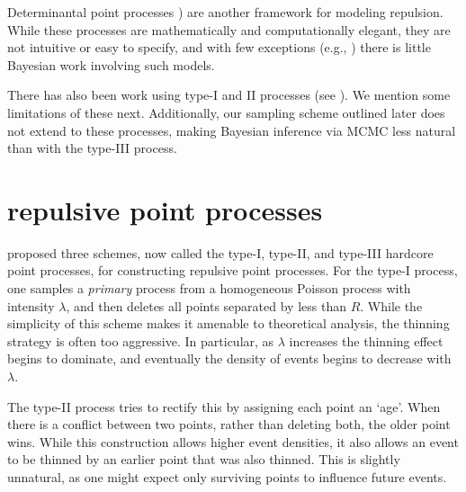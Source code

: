 \documentclass{statsoc}
\begin{document}
Determinantal point processes \citep{hough_dpp,Scardicchio09}) are another framework for modeling repulsion. While
these processes are mathematically and computationally elegant, they are not intuitive or easy to specify, and with few exceptions (e.g., \citet{affandi2014learning}) there is little Bayesian work involving such models. %


There has also been work using \matern type-I and II processes (see \cite{WallSar11}). We mention some limitations of these next. Additionally,
our sampling scheme outlined later does not extend to these processes, making Bayesian inference via MCMC less natural than with the
type-III process.

\section{\matern repulsive point processes}

\cite{Matern60} proposed three schemes, now called the \matern type-I, type-II, and type-III hardcore point processes,
for constructing repulsive point processes.
For the type-I process, one samples a \emph{primary} process from a homogeneous Poisson process 
with intensity $\lambda$, and then deletes all points separated by less than $R$. While the simplicity of this scheme makes it amenable to theoretical 
analysis, the thinning strategy is often too aggressive. In particular, %
as $\lambda$ increases the thinning effect begins to dominate, and eventually the density of \matern events begins to {decrease} with $\lambda$.

The \matern type-II process tries to rectify this by assigning each point an `age'.
When there is a conflict between two points, 
rather than deleting {both}, the older point wins. While this construction allows higher event densities, it also allows 
an event to be thinned by an earlier point that was also thinned. This is slightly unnatural, as one might expect only surviving points to influence 
future events. 
\end{document}
